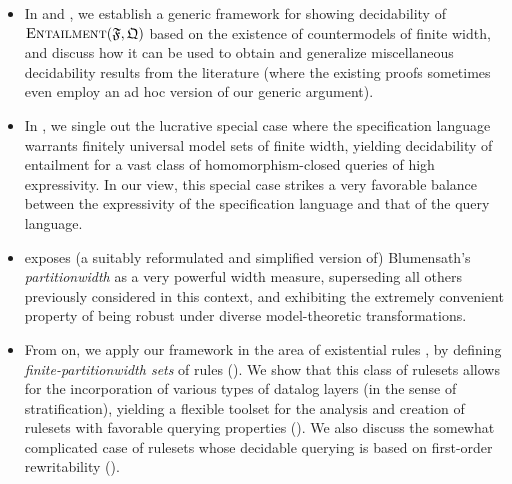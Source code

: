\begin{itemize}
\item In  and , we establish a generic framework for showing decidability of $\textsc{Entailment}(\mathfrak{F},\mathfrak{Q})$ based on the existence of countermodels of finite width, and discuss how it can be used to obtain and generalize miscellaneous decidability results from the literature (where the existing proofs sometimes even employ an ad hoc version of our generic argument).   

\item In , we single out the lucrative special case where the specification language warrants finitely universal model sets of finite width, yielding decidability of entailment for a vast class of homomorphism-closed queries of high expressivity. In our view, this special case strikes a very favorable balance between the expressivity of the specification language and that of the query language. 

\item {} exposes (a suitably reformulated and simplified version of) Blumensath's \emph{partitionwidth} \cite{Blumensath03,Blumensath06} as a very powerful width measure, superseding all others previously considered in this context, and exhibiting the extremely convenient property of being robust under diverse model-theoretic transformations.

\item From  on, we apply our framework in the area of existential rules%
, by defining \emph{finite-partitionwidth sets} of rules (). We show that this class of rulesets allows for the incorporation of various types of datalog layers (in the sense of stratification), yielding a flexible toolset for the analysis and creation of rulesets with favorable querying properties (). We also discuss the somewhat complicated case of rulesets whose decidable querying is based on first-order rewritability ().    
\end{itemize}



